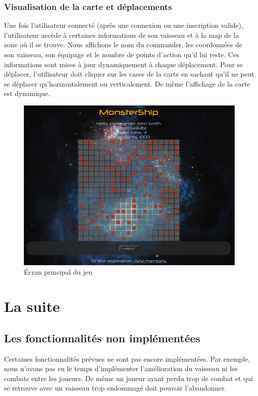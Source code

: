 \documentclass[a4paper,11pt]{report}
\begin{document}
    \subsection{Visualisation de la carte et déplacements}
      Une fois l'utilisateur connecté (après une connexion ou une inscription valide), l'utilisateur accède à certaines informations de son vaisseau et à la map de la zone où il se trouve.
      Nous affichons le nom du commander, les coordonnées de son vaisseau, son équipage et le nombre de points d'action qu'il lui reste. Ces informations sont mises à jour dynamiquement à chaque déplacement.
      Pour se déplacer, l'utilisateur doit cliquer sur les cases de la carte en sachant qu'il ne peut se déplacer qu'horizontalement ou verticalement. De même l'affichage de la carte est dynamique.
      \begin{figure}[H]
        \begin{center}
          \includegraphics[width=.8\textwidth]{images/home.png}
          \caption{Écran principal du jeu}
          \label{fig:ec_home}
        \end{center}
      \end{figure}

    

\chapter{La suite}

  \section{Les fonctionnalités non implémentées}
    Certaines fonctionnalités prévues ne sont pas encore implémentées. 
    Par exemple, nous n'avons pas eu le temps d'implémenter l'amélioration du vaisseau ni les combats entre les joueurs.
    De même un joueur ayant perdu trop de combat et qui se retrouve avec un vaisseau trop endommagé doit pouvoir l'abandonner.
    
\end{document}
